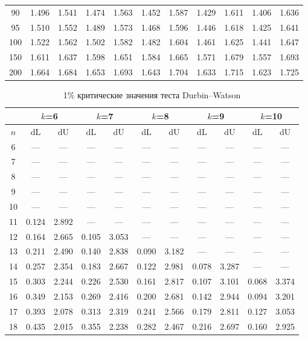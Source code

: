 \documentclass[12pt]{article}
\begin{document}
\begin{table}
\begin{center}
{\begin{tabular}{|c|c|c|c|c|c|c|c|c|c|c|}
	90&1.496&1.541&1.474&1.563&1.452&1.587&1.429&1.611&1.406&1.636\\
	95&1.510&1.552&1.489&1.573&1.468&1.596&1.446&1.618&1.425&1.641\\
	100&1.522&1.562&1.502&1.582&1.482&1.604&1.461&1.625&1.441&1.647\\
	150&1.611&1.637&1.598&1.651&1.584&1.665&1.571&1.679&1.557&1.693\\
	200&1.664&1.684&1.653&1.693&1.643&1.704&1.633&1.715&1.623&1.725\\
	\hline
\end{tabular}
}
\end{center}
\end{table}


\begin{table}
\caption{1\% критические значения теста Durbin--Watson}
\begin{center}
{\scriptsize
\begin{tabular}{|c|c|c|c|c|c|c|c|c|c|c|}
	\hline
	& \multicolumn{2}{c|}{$k$=6} & \multicolumn{2}{c|}{$k$=7}&
	\multicolumn{2}{c|}{$k$=8}& \multicolumn{2}{c|}{$k$=9} & \multicolumn{2}{c|}{$k$=10} \\
	\hline
	$n$ &dL &dU& dL& dU &dL &dU& dL &dU &dL& dU\\ \hline
	6&---&---&---&---&---&---&---&---&---&---\\
	7&---&---&---&---&---&---&---&---&---&---\\
	8&---&---&---&---&---&---&---&---&---&---\\
	9&---&---&---&---&---&---&---&---&---&---\\
	10&---&---&---&---&---&---&---&---&---&---\\
	11&0.124&2.892&---&---&---&---&---&---&---&---\\
	12&0.164&2.665&0.105&3.053&---&---&---&---&---&---\\
	13&0.211&2.490&0.140&2.838&0.090&3.182&---&---&---&---\\
	14&0.257&2.354&0.183&2.667&0.122&2.981&0.078&3.287&---&---\\
	15&0.303&2.244&0.226&2.530&0.161&2.817&0.107&3.101&0.068&3.374\\
	16&0.349&2.153&0.269&2.416&0.200&2.681&0.142&2.944&0.094&3.201\\
	17&0.393&2.078&0.313&2.319&0.241&2.566&0.179&2.811&0.127&3.053\\
	18&0.435&2.015&0.355&2.238&0.282&2.467&0.216&2.697&0.160&2.925\\

\end{tabular}}
\end{center}
\end{table}
\end{document}
